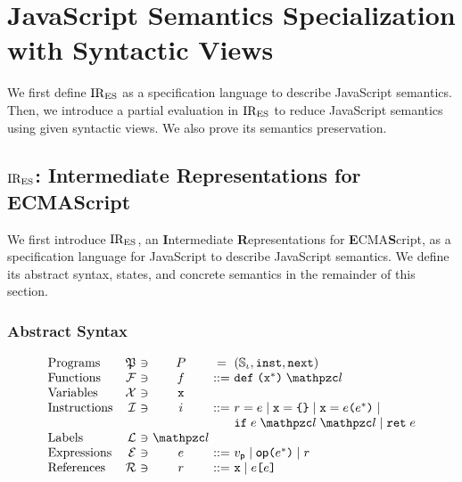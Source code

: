 \section{JavaScript Semantics Specialization with Syntactic Views}\label{sec:formal}

We first define $\text{IR}_\text{ES}$ as a specification language to describe JavaScript
semantics.  Then, we introduce a partial evaluation in $\text{IR}_\text{ES}$ to reduce
JavaScript semantics using given syntactic views. We also prove its semantics
preservation.

\subsection{$\text{IR}_\text{ES}$: Intermediate Representations for ECMAScript}

We first introduce $\text{IR}_\text{ES}$, an \textbf{I}ntermediate \textbf{R}epresentations
for \textbf{E}CMA\textbf{S}cript, as a specification language for JavaScript to
describe JavaScript semantics. We define its abstract syntax, states, and
concrete semantics in the remainder of this section.

\subsubsection{Abstract Syntax}

\[
  \begin{array}{lr@{~}c@{~}c@{~}c@{~}l}
    \text{Programs} & \progset &\ni& \prog &=& (\istset, \getinst, \getnext)\\

    \text{Functions} & \funcset &\ni& \func &::=&
    \kwdef \; \kwrl \varx^* \kwrr \; \lab\\

    \text{Variables} & \varset &\ni& \varx\\

    \text{Instructions} & \instset &\ni& \inst &::=&
    \refer = \expr \mid
    \varx = \kwcl \kwcr \mid
    \varx = \expr \kwrl \expr^* \kwrr \mid \\&&&&&
    \kwif \; \expr \; \lab \; \lab \mid
    \kwret \; \expr\\

    \text{Labels} & \labset &\ni& \lab\\

    \text{Expressions} & \exprset &\ni& \expr &::=&
    \pval \mid
    \op \kwrl \expr^* \kwrr \mid
    \refer\\

    \text{References} & \referset &\ni& \refer &::=&
    \varx \mid \expr \kwsl \expr \kwsr\\
  \end{array}
\]

